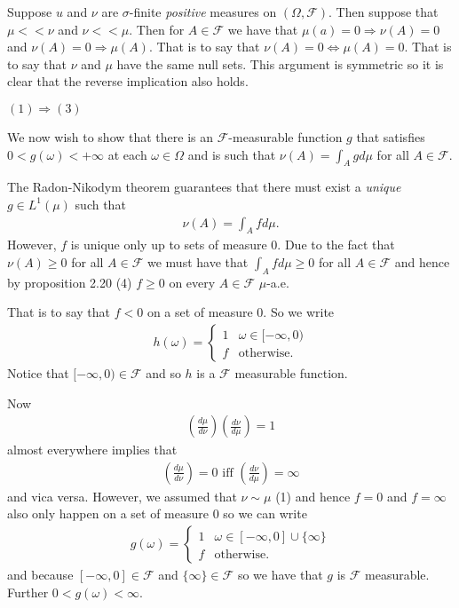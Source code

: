 \documentclass{unswmaths}
\begin{document}
Suppose $ u $ and $ \nu $ are $\sigma$-finite \emph{positive} measures on $ (\Omega, \mathcal{F}) $. Then suppose that $ \mu << \nu $ and $ \nu << \mu $.
Then for $ A \in \mathcal{F} $ we have that $ \mu(a) = 0 \Rightarrow \nu(A) = 0 $ and $ \nu(A) = 0 \Rightarrow \mu(A) $. That is to say that $ \nu(A) =0 \Leftrightarrow \mu(A) = 0 $. That is to say that $ \nu $ and $ \mu $ have the same null sets. This argument is symmetric so it is clear that the reverse implication also holds.

$(1) \Longrightarrow (3) $

We now wish to show that there is an $ \mathcal{F}$-measurable function $ g $ that satisfies $ 0 < g(\omega) < +\infty $ at each $ \omega \in \Omega $ and is such that $ \nu(A) = \int_Agd\mu $ for all $ A \in \mathcal{F} $.

The Radon-Nikodym theorem guarantees that there must exist a \emph{unique} $ g \in L^1(\mu)$ such that 
\begin{align}
	\nu(A) = \int_A fd\mu.
\end{align}
However, $ f $ is unique only up to sets of measure $ 0 $. Due to the fact that $ \nu(A) \geq 0 $ for all $ A \in \mathcal{F} $ we must have that 
$\int_A f d\mu \geq 0 $ for all $ A \in \mathcal{F} $ and hence by proposition 2.20 (4) $ f \geq 0 $ on every $ A \in \mathcal{F} $ $ \mu$-a.e.

That is to say that $ f < 0 $ on a set of measure 0. So we write
\begin{align}
	h(\omega) = 
	\begin{cases}
		1 & \omega \in [-\infty, 0) \\
		f & \text{otherwise}.
	\end{cases}
\end{align}
Notice that $ [-\infty, 0) \in \mathcal{F} $ and so $ h $ is a $ \mathcal{F} $ measurable function.

Now 
\begin{align}
	\left( \frac{d\mu}{d\nu} \right)\left( \frac{d\nu}{d\mu} \right) = 1 
\end{align}
almost everywhere implies that 
\begin{align}
\left( \frac{d\mu}{d\nu} \right) = 0 \text{ iff } \left( \frac{d\nu}{d\mu} \right) = \infty
\end{align}
and vica versa. However, we assumed that $ \nu \sim \mu $ (1) and hence $ f =0 $ and $ f = \infty $ also only happen on a set of measure 0 so we can write
\begin{align}
	g(\omega) = 
	\begin{cases}
		1 & \omega \in [-\infty, 0] \cup \{\infty\} \\
		f & \text{otherwise}.
	\end{cases}	
\end{align}
and because $ [-\infty, 0] \in \mathcal{F} $ and $ \{\infty\} \in \mathcal{F} $ so we have that $ g $ is $ \mathcal{F} $ measurable. Further $ 0 < g(\omega) < \infty $.
\end{document}
